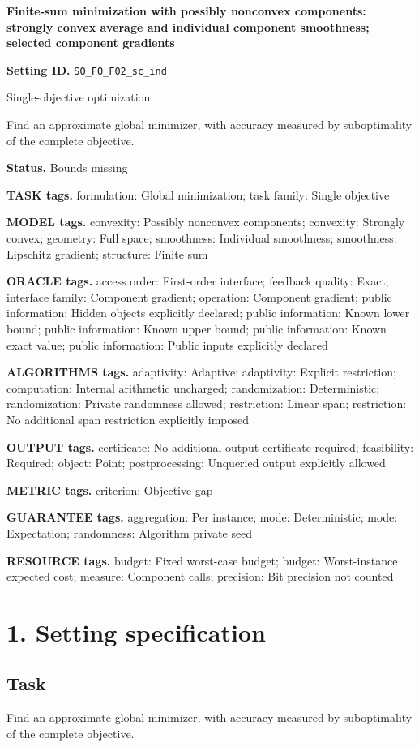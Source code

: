 \documentclass[10pt,a4paper]{article}
\begin{document}
\raggedright

{\LARGE\bfseries\sffamily\color{AtlasNavy} Finite-sum minimization with possibly nonconvex components: strongly convex average and individual component smoothness; selected component gradients\par}\vspace{5pt}
\textbf{Setting ID.} \texttt{SO\_\allowbreak{}FO\_\allowbreak{}F02\_\allowbreak{}sc\_\allowbreak{}ind}

Single-objective optimization

Find an approximate global minimizer, with accuracy measured by suboptimality of the complete objective.

\textbf{Status.} Bounds missing

\textbf{TASK tags.} formulation: Global minimization; task family: Single objective

\textbf{MODEL tags.} convexity: Possibly nonconvex components; convexity: Strongly convex; geometry: Full space; smoothness: Individual smoothness; smoothness: Lipschitz gradient; structure: Finite sum

\textbf{ORACLE tags.} access order: First-order interface; feedback quality: Exact; interface family: Component gradient; operation: Component gradient; public information: Hidden objects explicitly declared; public information: Known lower bound; public information: Known upper bound; public information: Known exact value; public information: Public inputs explicitly declared

\textbf{ALGORITHMS tags.} adaptivity: Adaptive; adaptivity: Explicit restriction; computation: Internal arithmetic uncharged; randomization: Deterministic; randomization: Private randomness allowed; restriction: Linear span; restriction: No additional span restriction explicitly imposed

\textbf{OUTPUT tags.} certificate: No additional output certificate required; feasibility: Required; object: Point; postprocessing: Unqueried output explicitly allowed

\textbf{METRIC tags.} criterion: Objective gap

\textbf{GUARANTEE tags.} aggregation: Per instance; mode: Deterministic; mode: Expectation; randomness: Algorithm private seed

\textbf{RESOURCE tags.} budget: Fixed worst-case budget; budget: Worst-instance expected cost; measure: Component calls; precision: Bit precision not counted

\section{1. Setting specification}
\subsection{Task}
Find an approximate global minimizer, with accuracy measured by suboptimality of the complete objective.
\end{document}
